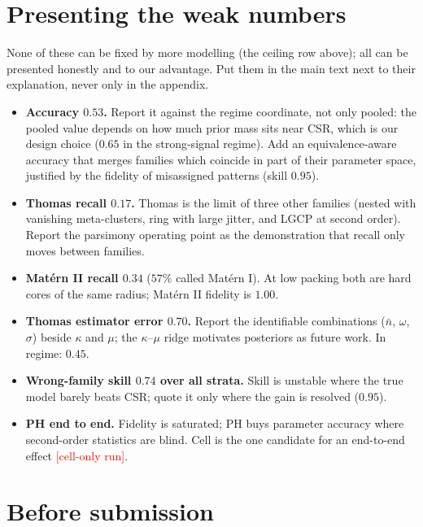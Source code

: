 \documentclass[11pt]{article}
\newcommand{\nb}{\bar n}
\newcommand{\pending}[1]{\textcolor{red}{[#1]}}
\begin{document}
\section*{Presenting the weak numbers}

None of these can be fixed by more modelling (the ceiling row above); all can be presented honestly and to our
advantage. Put them in the main text next to their explanation, never only in the appendix.
\begin{itemize}
  \item \textbf{Accuracy $0.53$.} Report it against the regime coordinate, not only pooled: the pooled value depends
    on how much prior mass sits near CSR, which is our design choice ($0.65$ in the strong-signal regime). Add an
    equivalence-aware accuracy that merges families which coincide in part of their parameter space, justified by the
    fidelity of misassigned patterns (skill $0.95$).
  \item \textbf{Thomas recall $0.17$.} Thomas is the limit of three other families (nested with vanishing
    meta-clusters, ring with large jitter, and LGCP at second order). Report the parsimony operating point as the
    demonstration that recall only moves between families.
  \item \textbf{Mat\'ern II recall $0.34$} ($57\%$ called Mat\'ern I). At low packing both are hard cores of the same
    radius; Mat\'ern II fidelity is $1.00$.
  \item \textbf{Thomas estimator error $0.70$.} Report the identifiable combinations ($\nb$, $\omega$, $\sigma$) beside
    $\kappa$ and $\mu$; the $\kappa$--$\mu$ ridge motivates posteriors as future work. In regime: $0.45$.
  \item \textbf{Wrong-family skill $0.74$ over all strata.} Skill is unstable where the true model barely beats CSR;
    quote it only where the gain is resolved ($0.95$).
  \item \textbf{PH end to end.} Fidelity is saturated; PH buys parameter accuracy where second-order statistics are
    blind. Cell is the one candidate for an end-to-end effect \pending{cell-only run}.
\end{itemize}

\section*{Before submission}
\end{document}
